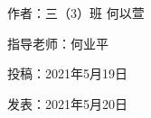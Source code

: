 \vspace{10pt}



作者：三（3）班 何以萱



指导老师：何业平



投稿：2021年5月19日





发表：2021年5月20日






                



\vspace{10pt}

\hline




